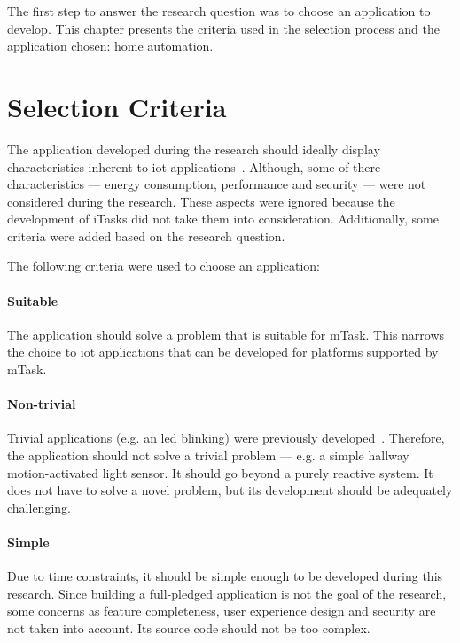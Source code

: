 The first step to answer the research question was to choose an application to develop. This chapter presents the criteria used in the selection process and the application chosen: home automation.

\section{Selection Criteria}\label{sec:selec_cri}

The application developed during the research should ideally display characteristics inherent to \acs{iot} applications~\cite{survey,survey2,survey3}. Although, some of there characteristics --- energy consumption, performance and security --- were not considered during the research. These aspects were ignored because the development of \gls{iTasks} did not take them into consideration. Additionally, some criteria were added based on the research question.

The following criteria were used to choose an application:

\paragraph{Suitable} The application should solve a problem that is suitable for \gls{mTask}. This narrows the choice to \ac{iot} applications that can be developed for platforms supported by \gls{mTask}.

\paragraph{Non-trivial} Trivial applications (e.g. an \acs{led} blinking) were previously developed~\cite{martthesis}. Therefore, the application should not solve a trivial problem --- e.g. a simple hallway  motion-activated light sensor. It should go beyond a purely reactive system. It does not have to solve a novel problem, but its development should be adequately challenging.

\paragraph{Simple} Due to time constraints, it should be simple enough to be developed during this research. Since building a full-pledged application is not the goal of the research, some concerns as feature completeness, user experience design and security are not taken into account. Its source code should not be too complex.

